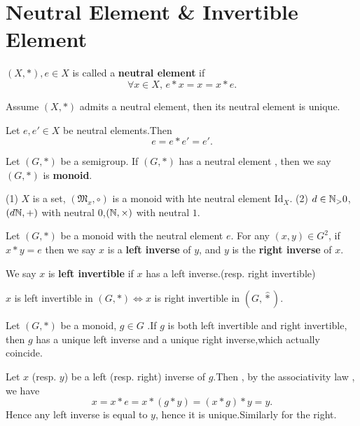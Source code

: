 \documentclass{book}
\numberwithin{equation}{section}
\begin{document}
\section{Neutral Element \& Invertible Element}
\begin{definitionenv}
    $(X,*),e\in X$ is called a \textbf{neutral element} if 
    $$\forall x\in X,\, e*x=x=x*e.$$
\end{definitionenv}
\begin{propositionenv}
    Assume $(X,*)$ admits a neutral element, then its neutral element is unique.
\end{propositionenv}
\begin{proofenv}
    Let $e,e'\in X$ be neutral elements.Then 
    $$e=e*e'=e'.$$
\end{proofenv}
\begin{definitionenv}
    Let $(G,*)$ be a semigroup. If $(G,*)$ has a neutral element , then we say $(G,*)$ is \textbf{monoid}.
\end{definitionenv}
\begin{exampleenv}
    \quad
    \newline
    (1) $X$ is a set, $(\mathfrak{M} _x,\circ)$ is a monoid with hte neutral element $\mathrm{Id}_X$.
    \newline
    (2) $d\in \mathbb{N}_>0$,$(d\mathbb{N},+)$ with neutral $0$,$(\mathbb{N},\times)$ with neutral $1$.
\end{exampleenv}
\begin{definitionenv}
    Let $(G,*)$ be a monoid with the neutral element $e$. For any $ (x,y)\in G^2$, if $x*y=e$ then we say $x$ is a \textbf{left inverse} of $y$, and $y$ is the \textbf{right inverse} of $x$.
\end{definitionenv}
\begin{remark}
    We say $x$ is \textbf{left invertible} if $x$ has a left inverse.(resp. right invertible)
\end{remark}
\begin{remark}
    $x$ is left invertible in $(G,*)\Leftrightarrow x $ is right invertible in $(G,\hat{*})$.
\end{remark}
\begin{propositionenv}
    Let $(G,*)$ be a monoid, $g\in G$ .If $g$ is both left invertible and right invertible, then $g$ has a unique left inverse and a unique right inverse,which actually coincide.
\end{propositionenv}
\begin{proofenv}
    Let $x$ (resp. $y$) be a left (resp. right) inverse of $g$.Then , by the associativity law , we have 
    $$x=x*e=x*(g*y)=(x*g)*y=y.$$
    Hence any left inverse is equal to $y$, hence it is unique.Similarly for the right.
\end{proofenv}
\end{document}
